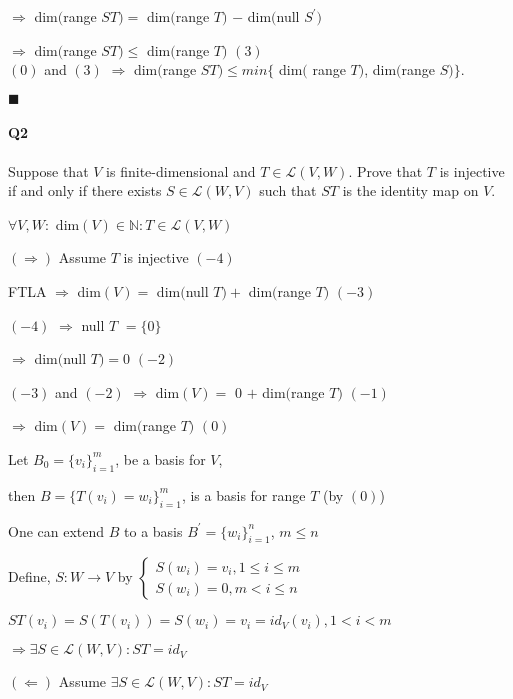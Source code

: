 \documentclass{article}
\begin{document}
$\Rightarrow$ dim$($range $ST) =$ dim$($range $T)$ $-$ dim$($null
$S^\prime)$

$\Rightarrow$ dim$($range $ST) \leq$ dim$($range $T)$ $(3)$\\


$(0)$ and $(3)$ $\Rightarrow$ dim$($range $ST) \leq min\{$ dim$($ range $T)$, dim$($range
$S)\}$.
\vspace{0.618 em}

$\blacksquare$


\newpage
\paragraph{Q2} Suppose that $V$ is finite-dimensional and $T\in \mathcal{L}(V, W )$. Prove
that $T$ is injective if and only if there exists $S\in \mathcal{L}(W,V)$ such that $ST$ is the identity map
on $V$.

\vspace{0.618 em}

$\forall V , W :$ dim$(V) \in \mathbb{N}: T\in \mathcal{L}(V, W)$

$(\Rightarrow)$ Assume $T$ is injective $(-4)$

FTLA $\Rightarrow$ dim$(V) =$ dim$($null $T) +$ dim$($range $T)$ $(-3)$

$(-4)$ $\Rightarrow$ null $T$ $= \{0\}$

$\Rightarrow$ dim$($null $T) = 0$ $(-2)$

$(-3)$ and $(-2)$ $\Rightarrow$ dim$(V) =$ $0$ $+$ dim$($range $T)$ $(-1)$

$\Rightarrow$ dim$(V) = $ dim$($range $T)$ $(0)$

Let $B_0 = \{v_i\}_{i=1}^m$, be a basis for $V$,

then $B = \{T(v_i)=w_i\}_{i=1}^m$, is a basis for range $T$ (by $(0)$)

One can extend $B$ to a basis $B^\prime = \{w_i\}_{i=1}^n$, $m \leq n$

Define, $S: W \rightarrow V$ by $\begin{cases}
  S(w_i) = v_i, 1 \leq i \leq m\\
  S(w_i) = 0, m < i \leq n
\end{cases}$

$ST(v_i) = S(T(v_i)) = S(w_i) = v_i = id_V(v_i), 1 < i < m$

$\Rightarrow \exists S \in \mathcal{L}(W,V): ST = id_V$

$(\Leftarrow)$ Assume $\exists S \in \mathcal{L}(W,V): ST = id_V$
\end{document}
